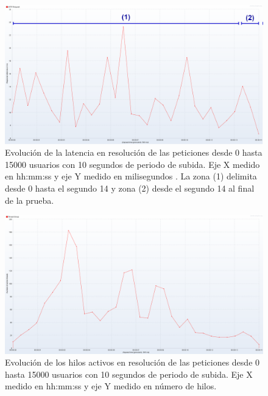 \begin{figure}[h]
\centering
\includegraphics[scale=0.28]{images/latencia15k10s.png}
\caption[Evolución de la latencia con 15000 usuarios y 10 segundos de subida]{Evolución de la latencia en resolución de las peticiones desde 0 hasta 15000 usuarios con 10 segundos de periodo de subida. Eje X medido en {\ttfamily hh:mm:ss} y eje Y medido en milisegundos . La zona (1) delimita desde 0 hasta el segundo 14 y zona (2) desde el segundo 14 al final de la prueba.}%
\label{fig:latencia15k10s}
\end{figure}

\begin{figure}[h]
\centering
\includegraphics[scale=0.28]{images/hilosActivosGraf15k10subida.png}
\caption[Evolución de hilos activos con 15000 usuarios y 10 segundos de subida]{Evolución de los hilos activos en resolución de las peticiones desde 0 hasta 15000 usuarios con 10 segundos de periodo de subida. Eje X medido en {\ttfamily hh:mm:ss} y eje Y medido en número de hilos.}%
\label{fig:hilosactivos}
\end{figure}